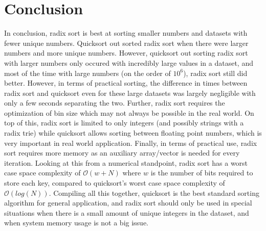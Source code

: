 \documentclass[11pt]{article}
\begin{document}
\section{Conclusion}

In conclusion, radix sort is best at sorting smaller numbers and datasets with fewer unique numbers. Quicksort out sorted radix sort when there were larger numbers and more unique numbers. However, quicksort out sorting radix sort with larger numbers only occured with incredibly large values in a dataset, and most of the time with large numbers (on the order of $10^6$), radix sort still did better. However, in terms of practical sorting, the difference in times between radix sort and quicksort even for these large datasets was largely negligible with only a few seconds separating the two. Further, radix sort requires the optimization of bin size which may not always be possible in the real world. On top of this, radix sort is limited to only integers (and possibly strings with a radix trie) while quicksort allows sorting between floating point numbers, which is very important in real world application. Finally, in terms of practical use, radix sort requires more memory as an auxiliary array/vector is needed for every iteration. Looking at this from a numerical standpoint, radix sort has a worst case space complexity of $\mathcal{O}(w + N)$ where $w$ is the number of bits required to store each key, compared to quicksort's worst case space complexity of $\mathcal{O}(log(N))$. Compiling all this together, quicksort is the best standard sorting algorithm for general application, and radix sort should only be used in special situations when there is a small amount of unique integers in the dataset, and when system memory usage is not a big issue.

\printbibliography
\end{document}
